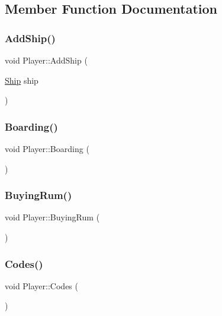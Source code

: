 \subsection{Member Function Documentation}
\mbox{\label{class_player_a57f5ee759da818da979fec48084c1551}} 
\subsubsection{\texorpdfstring{Add\+Ship()}{AddShip()}}
{\footnotesize\ttfamily void Player\+::\+Add\+Ship (\begin{DoxyParamCaption}\item[{\hyperlink{class_ship}{Ship}}]{ship }\end{DoxyParamCaption})}

\mbox{\label{class_player_ac5e6adb315692e210db2293f846e5d40}} 
\subsubsection{\texorpdfstring{Boarding()}{Boarding()}}
{\footnotesize\ttfamily void Player\+::\+Boarding (\begin{DoxyParamCaption}{ }\end{DoxyParamCaption})}

\mbox{\label{class_player_a9a02542fcb29f6facb130883cfb1bbed}} 
\subsubsection{\texorpdfstring{Buying\+Rum()}{BuyingRum()}}
{\footnotesize\ttfamily void Player\+::\+Buying\+Rum (\begin{DoxyParamCaption}{ }\end{DoxyParamCaption})}

\mbox{\label{class_player_ac83f16a857e7af30ea9cb10d268f5e97}} 
\subsubsection{\texorpdfstring{Codes()}{Codes()}}
{\footnotesize\ttfamily void Player\+::\+Codes (\begin{DoxyParamCaption}{ }\end{DoxyParamCaption})}

